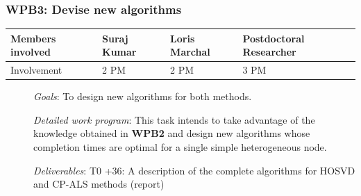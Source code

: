 \documentclass[a4paper,11pt]{article}
\newcommand{\subtask}[1]{{\color{orange}\paragraph{#1}$ $}}
\newcommand{\goal}{{\color{orange2}  \emph{Goals}:} }
\newcommand{\dwp}{{\color{orange2}  \emph{Detailed work program}: }}
\newcommand{\deliverables}{{\color{orange2}  \emph{Deliverables}: }}
\begin{document}
	\subsubsection{\textbf{WPB3}: Devise new algorithms}
	\begin{table}[H]
		\begin{tabular}{llll}
			\hline
			\cellcolor{blue2}
			Members involved & Suraj Kumar& Loris Marchal & Postdoctoral Researcher \\
			\hline
			\cellcolor{orange2}
			Involvement      & 2 PM            & 2 PM & 3 PM \\
			\hline
		\end{tabular}
	\end{table}
	\begin{description}
		\item[] \goal To design new algorithms for both methods. 
		\item[] \dwp This task intends to take advantage of the knowledge obtained in \textbf{WPB2} and design new algorithms whose completion times are optimal for a single simple heterogeneous node.
		\item[] \deliverables\newline
		T0 +36: A description of the complete algorithms for HOSVD and CP-ALS methods (report)
	\end{description}
	
\end{document}
